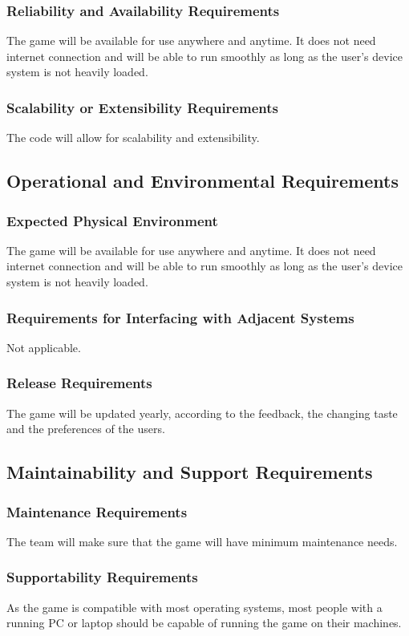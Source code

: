\documentclass{article}
\begin{document}
\subsubsection{Reliability and Availability Requirements}
The game will be available for use anywhere and anytime. It does not need internet connection and will be able to run smoothly as long as the user’s device system is not heavily loaded.
\subsubsection{Scalability or Extensibility Requirements}
The code will allow for scalability and extensibility.

\subsection{Operational and Environmental Requirements}
\subsubsection{Expected Physical Environment}
The game will be available for use anywhere and anytime. It does not need internet connection and will be able to run smoothly as long as the user’s device system is not heavily loaded.
\subsubsection{Requirements for Interfacing with Adjacent Systems}
Not applicable.
\subsubsection{Release Requirements}
The game will be updated yearly, according to the feedback, the changing taste and the preferences of the users.

\subsection{Maintainability and Support Requirements}
\subsubsection{ Maintenance Requirements}
The team will make sure that the game will have minimum maintenance needs.
\subsubsection{Supportability Requirements}
As the game is compatible with most operating systems, most people with a running PC or laptop should be capable of running the game on their machines.
\end{document}
